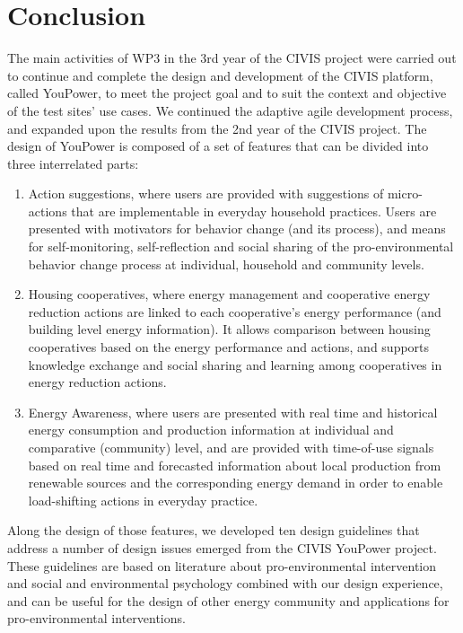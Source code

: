 \section{Conclusion}

The main activities of WP3 in the 3rd year of the CIVIS project were carried out to continue and complete the design and development of the CIVIS platform, called YouPower, to meet the project goal and to suit the context and objective of the test sites' use cases. 
We continued the adaptive agile development process, and expanded upon the results from the 2nd year of the CIVIS project. The design of YouPower is composed of a set of features that can be divided into three interrelated parts: 
\begin{enumerate}
\item Action suggestions, where users are provided with suggestions of micro-actions that are implementable in everyday household practices. Users are presented with motivators for behavior change (and its process), and means for self-monitoring, self-reflection and social sharing of the pro-environmental behavior change process at individual, household and community levels.

\item Housing cooperatives, where energy management and cooperative energy reduction actions are linked to each cooperative's energy performance (and building level energy information). It allows comparison between housing cooperatives based on the energy performance and actions, and supports knowledge exchange and social sharing and learning among cooperatives in energy reduction actions.

\item Energy Awareness, where users are presented with real time and historical energy consumption and production information at individual and comparative (community) level, and are provided with time-of-use signals based on real time and forecasted information about local production from renewable sources and the corresponding energy demand in order to enable load-shifting actions in everyday practice. 

\end{enumerate}

Along the design of those features, we developed ten design guidelines that address a number of design issues emerged from the CIVIS YouPower project. These guidelines are based on literature about pro-environmental intervention and social and environmental psychology combined with our design experience, and can be useful for the design of other energy community and applications for pro-environmental interventions. 

